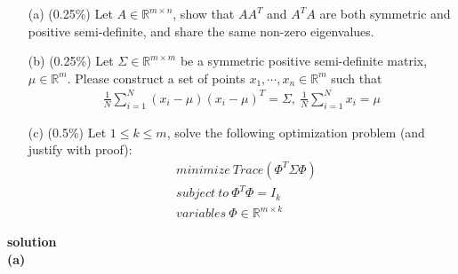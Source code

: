 \documentclass{article}
\begin{document}
\begin{enumerate}
    \item[(a)] (0.25\%) Let $A \in {\mathbb R}^{m \times n}$, show that $AA^T$ and $A^TA$ are both symmetric and positive semi-definite, and share the same non-zero eigenvalues.
    \item[(b)] (0.25\%) Let $\Sigma \in {\mathbb R}^{m \times m}$ be a symmetric positive semi-definite matrix, $\mu \in {\mathbb R}^m$. Please construct a set of points $x_1, \cdots, x_n \in {\mathbb R}^m$ such that
    \begin{align*}
        \frac{1}{N} \sum_{i = 1}^{N} (x_i - \mu)(x_i - \mu)^T = \Sigma,\ \frac{1}{N} \sum_{i = 1}^{N} x_i = \mu
    \end{align*}
    \item[(c)] (0.5\%) Let $1 \le k \le m$, solve the following optimization problem (and justify with proof):
    \begin{align*}
        &minimize\ Trace(\Phi^T \Sigma \Phi)\\
        &subject\ to\ \Phi^T \Phi = I_k\\
        &variables\ \Phi \in {\mathbb R}^{m \times k}
    \end{align*}
\end{enumerate}

\noindent
{\bf \large solution}\\

\noindent
{\bf (a)}\\
\end{document}
